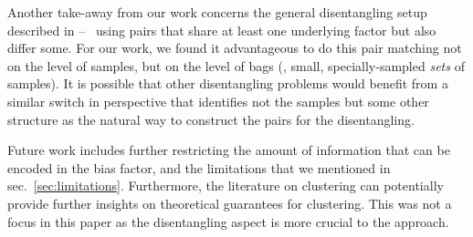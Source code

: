 Another take-away from our work concerns the general disentangling setup described in
\citet{locatello2020weakly}
-- \ie\ using pairs that share at least one underlying factor but also differ some.
For our work, we found it advantageous to do this pair matching not on the level of samples,
but on the level of bags (\ie, small, specially-sampled \emph{sets} of samples).
It is possible that other disentangling problems would benefit
from a similar switch in perspective
that identifies not the samples but some other structure
as the natural way to construct the pairs for the disentangling.

Future work includes further restricting the amount of information that can be encoded in the bias factor, and the limitations that we mentioned in sec.~\ref{sec:limitations}.
Furthermore, the literature on clustering can potentially provide further insights on theoretical guarantees for clustering.
This was not a focus in this paper as the disentangling aspect is more crucial to the approach.





% 
% 


% 



